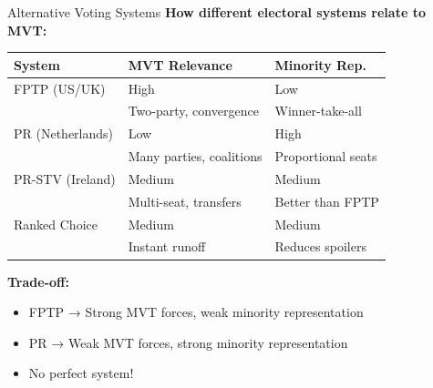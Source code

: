 \documentclass[10pt]{beamer}
\begin{document}
\begin{frame}{Alternative Voting Systems}
\textbf{How different electoral systems relate to MVT:}


\begin{table}
\centering
\small
\begin{tabular}{lll}
\toprule
\textbf{System} & \textbf{MVT Relevance} & \textbf{Minority Rep.} \\
\midrule
FPTP (US/UK) & High & Low \\
& Two-party, convergence & Winner-take-all \\
\midrule
PR (Netherlands) & Low & High \\
& Many parties, coalitions & Proportional seats \\
\midrule
PR-STV (Ireland) & Medium & Medium \\
& Multi-seat, transfers & Better than FPTP \\
\midrule
Ranked Choice & Medium & Medium \\
& Instant runoff & Reduces spoilers \\
\bottomrule
\end{tabular}
\end{table}



\textbf{Trade-off:}
\begin{itemize}
\item FPTP → Strong MVT forces, weak minority representation
\item PR → Weak MVT forces, strong minority representation
\item No perfect system!
\end{itemize}
\end{frame}
\end{document}
